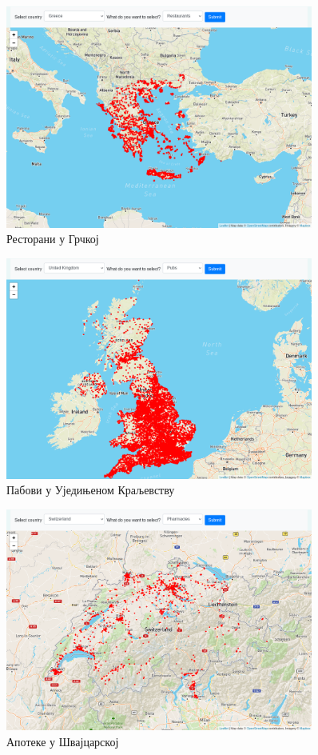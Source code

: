 \documentclass[12pt,oneside]{memoir}
\begin{document}
\begin{figure}[!ht]
  \centering
  \includegraphics[width=0.9\textwidth]{pictures/greece_restaurants.png}
  \caption{Ресторани у Грчкој}
  \label{fig:app_code_greece_restaurants}
\end{figure}

\begin{figure}[!ht]
  \centering
  \includegraphics[width=0.9\textwidth]{pictures/uk_pubs.png}
  \caption{Пабови у Уједињеном Краљевству}
  \label{fig:app_code_uk_pubs}
\end{figure}

\begin{figure}[!ht]
  \centering
  \includegraphics[width=0.9\textwidth]{pictures/switzerland_pharmacies.png}
  \caption{Апотеке у Швајцарској}
  \label{fig:app_code_switzerland_pharmacies}
\end{figure}
\end{document}
